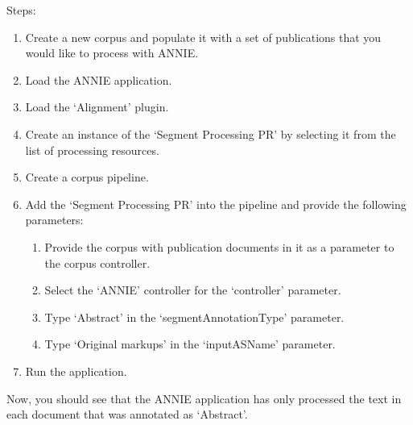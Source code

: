 Steps:
\begin{enumerate}
\item Create a new corpus and populate it with a set of publications that you 
would like to process with ANNIE.
\item Load the ANNIE application.
\item Load the `Alignment' plugin.
\item Create an instance of the `Segment Processing PR' by selecting it from
the list of processing resources.
\item Create a corpus pipeline.
\item Add the `Segment Processing PR' into the pipeline and provide the 
following parameters:
\begin{enumerate}
\item Provide the corpus with publication documents in it as a parameter to
the corpus controller.
\item Select the `ANNIE' controller for the `controller' parameter.
\item Type `Abstract' in the `segmentAnnotationType' parameter.
\item Type `Original markups' in the `inputASName' parameter.
\end{enumerate}
\item Run the application.
\end{enumerate}

Now, you should see that the ANNIE application has only processed the text in 
each document that was annotated as `Abstract'.
